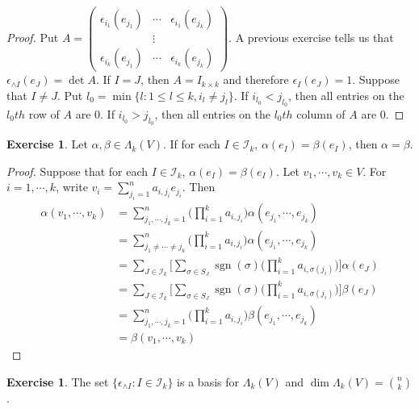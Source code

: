 \documentclass[12pt]{amsart}
\theoremstyle{definition}
\theoremstyle{definition}
\newtheorem{ex}[definition]{Exercise}
\newcommand{\al}{\alpha}
\newcommand{\bet}{\beta}
\newcommand{\Lam}{\Lambda}
\newcommand{\ep}{\epsilon}
\newcommand{\sig}{\sigma}
\newcommand{\MI}{\mathcal{I}}
\DeclareMathOperator{\sgn}{sgn}
\begin{document}
	\begin{proof}
		Put $A = \begin{pmatrix}
			\ep_{i_1}(e_{j_1}) & \cdots & \ep_{i_1}(e_{j_k}) \\
			& \vdots & \\
			\ep_{i_k}(e_{j_1}) & \cdots & \ep_{i_k}(e_{j_k}) 
		\end{pmatrix}$.
		A previous exercise tells us that $\ep_{\wedge I} (e_J) = \det A$.
		If $I = J$, then $A = I_{k\times k}$ and therefore $\ep_I(e_J) = 1$. Suppose that $I \neq J$. Put $l_0 = \min \{l: 1 \leq l \leq k, i_l \neq j_l\}$. If $i_{l_0} < j_{l_0}$, then all entries on the $l_0th$ row of $A$ are $0$. If $i_{l_0} > j_{l_0}$, then all entries on the $l_0th$ column of $A$ are $0$.
	\end{proof}

	\begin{ex}
		Let $\al , \bet \in \Lam_k(V)$. If for each $I \in \MI_k$, $\al(e_I) = \bet(e_I)$, then $\al = \bet$.
	\end{ex}

	\begin{proof}
		Suppose that for each $I \in \MI_k$, $\al(e_I) = \bet(e_I)$. Let $v_1, \cdots, v_k \in V$. For $i = 1, \cdots, k$, write $v_i = \sum_{j_i = 1}^n a_{i,j_i}e_{j_i}$. Then 
		\begin{align*}
			\al(v_1, \cdots, v_k) 
			&= \sum_{j_1, \cdots, j_k =1}^n \bigg( \prod_{i=1}^k a_{i, j_i} \bigg) \al(e_{j_1}, \cdots, e_{j_k}) \\
			&= \sum_{j_1 \neq \cdots \neq j_k}^n \bigg( \prod_{i=1}^k a_{i, j_i} \bigg) \al(e_{j_1}, \cdots, e_{j_k}) \\
			&= \sum_{J \in \MI_k} \bigg [ \sum_{\sig \in S_J} \sgn(\sig) \bigg( \prod_{i=1}^k a_{i, \sig(j_i)} \bigg) \bigg] \al(e_J) \\
			&= \sum_{J \in \MI_k} \bigg [ \sum_{\sig \in S_J} \sgn(\sig) \bigg( \prod_{i=1}^k a_{i, \sig(j_i)} \bigg) \bigg] \bet(e_J) \\
			&= \sum_{j_1, \cdots, j_k =1}^n \bigg( \prod_{i=1}^k a_{i, j_i} \bigg) \bet(e_{j_1}, \cdots, e_{j_k}) \\
			&= \bet(v_1, \cdots, v_k) 
		\end{align*}
	
	\end{proof}

	\begin{ex}
		The set $\{\ep_{\wedge I} : I \in \MI_k\}$ is a basis for $\Lam_k(V)$ and $\dim \Lam_k(V) = {n \choose k}$.
	\end{ex}
\end{document}
